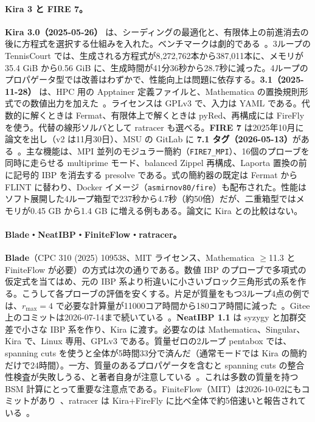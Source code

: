 \documentclass[a4paper,10pt]{ltjsarticle}
\begin{document}
\paragraph{Kira 3 と FIRE 7。}\textbf{Kira 3.0（2025-05-26）} は、シーディングの最適化と、有限体上の前進消去の後に方程式を選択する仕組みを入れた。ベンチマークは劇的である~\cite{r74}。3ループの TennisCourt では、生成される方程式が8,272,762本から387,011本に、メモリが35.4 GiB から0.56 GiB に、生成時間が41分36秒から28.7秒に減った。4ループのプロパゲータ型では改善はわずかで、性能向上は問題に依存する。\textbf{3.1（2025-11-28）} は、HPC 用の Apptainer 定義ファイルと、Mathematica の置換規則形式での数値出力を加えた~\cite{r75}。ライセンスは GPLv3 で、入力は YAML である。代数的に解くときは Fermat、有限体上で解くときは pyRed、再構成には FireFly を使う。代替の線形ソルバとして ratracer も選べる。\textbf{FIRE 7} は2025年10月に論文を出し（v2 は11月30日）、MSU の GitLab に \textbf{7.1 タグ（2026-05-13）}がある~\cite{r76,r77}。主な機能は、MPI 並列のモジュラー簡約（\texttt{FIRE7\_MPI}）、16個のプローブを同時に走らせる multiprime モード、balanced Zippel 再構成、Laporta 置換の前に記号的 IBP を消去する presolve である。式の簡約器の既定は Fermat から FLINT に替わり、Docker イメージ（\texttt{asmirnov80/fire}）も配布された。性能はソフト展開した4ループ箱型で237秒から4.7秒（約50倍）だが、二重箱型ではメモリが0.45 GB から1.4 GB に増える例もある。論文に Kira との比較はない。

\paragraph{Blade・NeatIBP・FiniteFlow・ratracer。}\textbf{Blade}（CPC 310 (2025) 109538、MIT ライセンス、Mathematica $\geq$11.3 と FiniteFlow が必要）の方式は次の通りである。数値 IBP のプローブで多項式の仮定式を当てはめ、元の IBP 系より桁違いに小さいブロック三角形式の系を作る。こうして各プローブの評価を安くする。片足が質量をもつ3ループ4点の例では、$r_{\max}=4$ で必要な計算量が11000コア時間から180コア時間に減った~\cite{r78}。Gitee 上のコミットは2026-07-14まで続いている~\cite{r79}。\textbf{NeatIBP 1.1} は syzygy と加群交差で小さな IBP 系を作り、Kira に渡す。必要なのは Mathematica、Singular、Kira で、Linux 専用、GPLv3 である。質量ゼロの2ループ pentabox では、spanning cuts を使うと全体が5時間33分で済んだ（通常モードでは Kira の簡約だけで24時間）。一方、質量のあるプロパゲータを含むと spanning cuts の整合性検査が失敗しうる、と著者自身が注意している~\cite{r80}。これは多数の質量を持つ BSM 計算にとって重要な注意点である。FiniteFlow（MIT）は2026-10-02にもコミットがあり~\cite{r81}、ratracer は Kira+FireFly に比べ全体で約5倍速いと報告されている~\cite{r82}。
\end{document}

